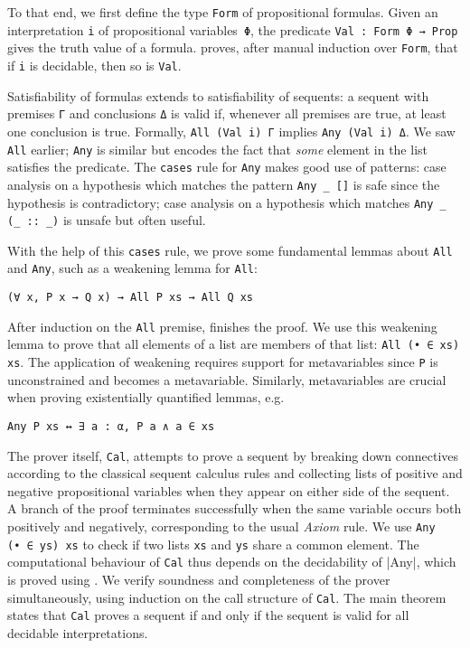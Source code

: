 To that end, we first define the type \texttt{Form} of propositional formulas.
Given an interpretation \texttt{i} of propositional variables~\texttt{Φ}, the predicate \texttt{Val~: Form~Φ~→ Prop} gives the truth value of a formula.
\Aesop{} proves, after manual induction over \texttt{Form}, that if \texttt{i} is decidable, then so is \texttt{Val}.

Satisfiability of formulas extends to satisfiability of sequents: a sequent with premises \texttt{Γ} and conclusions \texttt{Δ} is valid if, whenever all premises are true, at least one conclusion is true.
Formally, \texttt{All~(Val~i)~Γ} implies \texttt{Any~(Val~i)~Δ}.
We saw \texttt{All} earlier; \texttt{Any} is similar but encodes the fact that \emph{some} element in the list satisfies the predicate.
The \texttt{cases} rule for \texttt{Any} makes good use of patterns: case analysis on a hypothesis which matches the pattern \verb|Any _ []| is safe since the hypothesis is contradictory; case analysis on a hypothesis which matches \verb|Any _ (_ :: _)| is unsafe but often useful.

With the help of this \texttt{cases} rule, we prove some fundamental lemmas about \texttt{All} and \texttt{Any}, such as a weakening lemma for \texttt{All}:
\begin{lstlisting}
(∀ x, P x → Q x) → All P xs → All Q xs
\end{lstlisting}
After induction on the \texttt{All} premise, \Aesop{} finishes the proof.
We use this weakening lemma to prove that all elements of a list are members of that list: \texttt{All (•~∈~xs) xs}.
The application of weakening requires support for metavariables since \texttt{P} is unconstrained and becomes a metavariable.
Similarly, metavariables are crucial when proving existentially quantified lemmas, e.g.
\begin{lstlisting}
Any P xs ↔ ∃ a : α, P a ∧ a ∈ xs
\end{lstlisting}

The prover itself, \texttt{Cal}, attempts to prove a sequent by breaking down connectives according to the classical sequent calculus rules and collecting lists
of positive and negative propositional variables when they appear on either side of the sequent.
A branch of the proof terminates successfully when the same variable occurs both positively and negatively, corresponding to the usual \emph{Axiom} rule.
We use \texttt{Any (•~∈~ys) xs} to check if two lists \texttt{xs} and \texttt{ys} share a common element.
The computational behaviour of \texttt{Cal} thus depends on the decidability of |Any|, which is proved using \Aesop.
We verify soundness and completeness of the prover simultaneously, using induction on the call structure of \texttt{Cal}.
The main theorem states that \texttt{Cal} proves a sequent if and only if the sequent is valid for all decidable interpretations.

